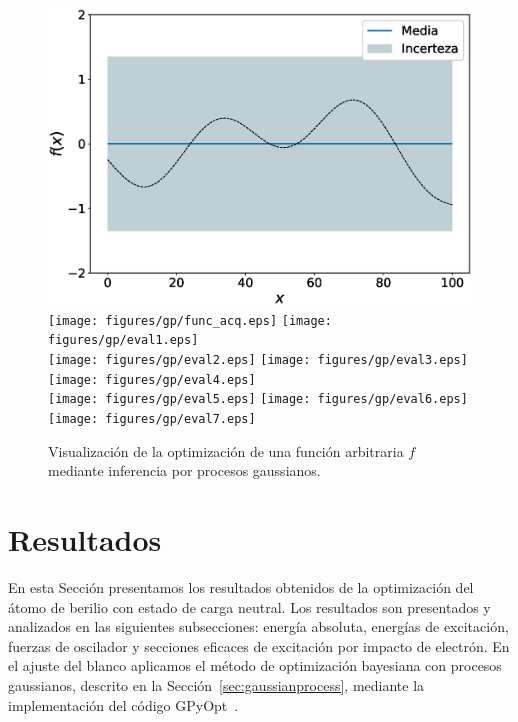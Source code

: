 \begin{figure}
\centering
\includegraphics[trim={1.0cm 0 2cm 1cm},clip,height=0.2\textheight]{figures/gp/funcion.eps} 
\texttt{[image: figures/gp/func\_acq.eps]} 
\texttt{[image: figures/gp/eval1.eps]} \\
\vspace{-0.5cm}
\texttt{[image: figures/gp/eval2.eps]}
\texttt{[image: figures/gp/eval3.eps]}
\texttt{[image: figures/gp/eval4.eps]} \\
\vspace{-0.5cm}
\texttt{[image: figures/gp/eval5.eps]}
\texttt{[image: figures/gp/eval6.eps]}
\texttt{[image: figures/gp/eval7.eps]} 
\caption{Visualización de la optimización de una función arbitraria $f$ 
mediante inferencia por procesos gaussianos.}
\label{fig:visualizacion-gp}
\end{figure}



\newpage
\section{Resultados}

En esta Sección presentamos los resultados obtenidos de la optimización
del átomo de berilio con estado de carga neutral. Los resultados son 
presentados y analizados en las siguientes subsecciones: energía 
absoluta, energías de excitación, fuerzas de oscilador y secciones 
eficaces de excitación por impacto de electrón. En el ajuste del blanco 
aplicamos el método de optimización bayesiana con procesos gaussianos, 
descrito en la Sección~\ref{sec:gaussianprocess}, mediante la 
implementación del código GPyOpt~\cite{GPyOpt}.

